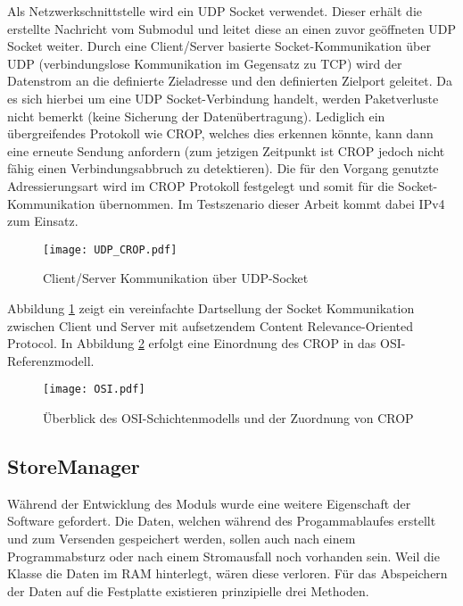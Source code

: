 Als Netzwerkschnittstelle wird ein UDP Socket verwendet. Dieser erh{\"a}lt die
erstellte Nachricht vom Submodul  und leitet diese an einen
zuvor ge{\"o}ffneten UDP Socket weiter. Durch eine Client/Server basierte
Socket-Kommunikation {\"u}ber UDP (verbindungslose Kommunikation im Gegensatz
zu TCP) wird der Datenstrom an die definierte Zieladresse und den definierten
Zielport geleitet. Da es sich hierbei um eine UDP Socket-Verbindung handelt,
werden Paketverluste nicht bemerkt (keine Sicherung der Daten{\"u}bertragung).
Lediglich ein {\"u}bergreifendes Protokoll wie CROP, welches dies erkennen
k{\"o}nnte, kann dann eine erneute Sendung anfordern (zum jetzigen Zeitpunkt
ist CROP jedoch nicht f{\"a}hig einen Verbindungsabbruch zu detektieren). Die
f{\"u}r den Vorgang genutzte Adressierungsart wird im CROP Protokoll festgelegt
und somit f{\"u}r die Socket-Kommunikation {\"u}bernommen. Im Testszenario
dieser Arbeit kommt dabei IPv4 zum Einsatz.

\begin{figure}[H]
\centering
\texttt{[image: UDP\_CROP.pdf]}
\caption{Client/Server Kommunikation {\"u}ber UDP-Socket}
\label{fig:Socket-Kommunikation}
\end{figure}

Abbildung \ref{fig:Socket-Kommunikation} zeigt ein vereinfachte Dartsellung der
Socket Kommunikation zwischen Client und Server mit aufsetzendem Content
Relevance-Oriented Protocol. In Abbildung \ref{fig:OSI} erfolgt eine Einordnung
des CROP in das OSI-Referenzmodell.

\begin{figure}[H]
\centering
\texttt{[image: OSI.pdf]}
\caption{{\"U}berblick des OSI-Schichtenmodells und der Zuordnung von CROP}
\label{fig:OSI}
\end{figure}



\subsection{StoreManager}

W{\"a}hrend der Entwicklung des Moduls  wurde eine weitere Eigenschaft
der Software gefordert.
Die Daten, welchen w{\"a}hrend des Progammablaufes erstellt und zum Versenden
gespeichert werden, sollen auch nach einem Programmabsturz oder nach einem
Stromausfall noch vorhanden sein. Weil die Klasse 
die Daten im RAM hinterlegt, w{\"a}ren diese verloren.
F{\"u}r das Abspeichern der Daten auf die Festplatte existieren prinzipielle drei Methoden.


